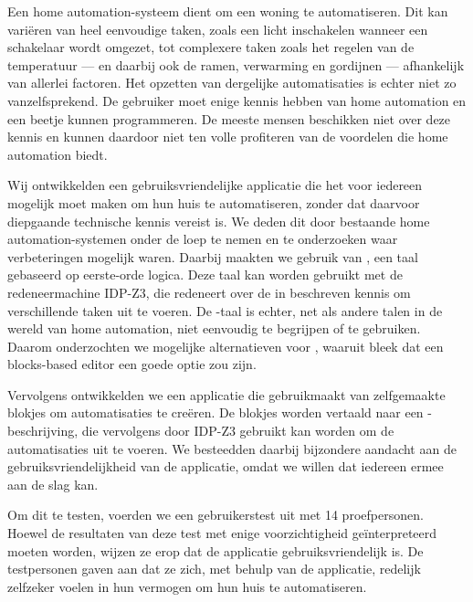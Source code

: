 Een home automation-systeem dient om een woning te automatiseren. Dit kan variëren van heel eenvoudige taken, zoals een licht inschakelen wanneer een schakelaar wordt omgezet, tot complexere taken zoals het regelen van de temperatuur — en daarbij ook de ramen, verwarming en gordijnen — afhankelijk van allerlei factoren. Het opzetten van dergelijke automatisaties is echter niet zo vanzelfsprekend. De gebruiker moet enige kennis hebben van home automation en een beetje kunnen programmeren. De meeste mensen beschikken niet over deze kennis en kunnen daardoor niet ten volle profiteren van de voordelen die home automation biedt.

Wij ontwikkelden een gebruiksvriendelijke applicatie die het voor iedereen mogelijk moet maken om hun huis te automatiseren, zonder dat daarvoor diepgaande technische kennis vereist is. We deden dit door bestaande home automation-systemen onder de loep te nemen en te onderzoeken waar verbeteringen mogelijk waren. Daarbij maakten we gebruik van \fodot, een taal gebaseerd op eerste-orde logica. Deze taal kan worden gebruikt met de redeneermachine IDP-Z3, die redeneert over de in \fodot beschreven kennis om verschillende taken uit te voeren. De \fodot-taal is echter, net als andere talen in de wereld van home automation, niet eenvoudig te begrijpen of te gebruiken. Daarom onderzochten we mogelijke alternatieven voor \fodot, waaruit bleek dat een blocks-based editor een goede optie zou zijn.

Vervolgens ontwikkelden we een applicatie die gebruikmaakt van zelfgemaakte blokjes om automatisaties te creëren. De blokjes worden vertaald naar een \fodot-beschrijving, die vervolgens door IDP-Z3 gebruikt kan worden om de automatisaties uit te voeren. We besteedden daarbij bijzondere aandacht aan de gebruiksvriendelijkheid van de applicatie, omdat we willen dat iedereen ermee aan de slag kan.

Om dit te testen, voerden we een gebruikerstest uit met 14 proefpersonen. Hoewel de resultaten van deze test met enige voorzichtigheid ge\"interpreteerd moeten worden, wijzen ze erop dat de applicatie gebruiksvriendelijk is. De testpersonen gaven aan dat ze zich, met behulp van de applicatie, redelijk zelfzeker voelen in hun vermogen om hun huis te automatiseren.